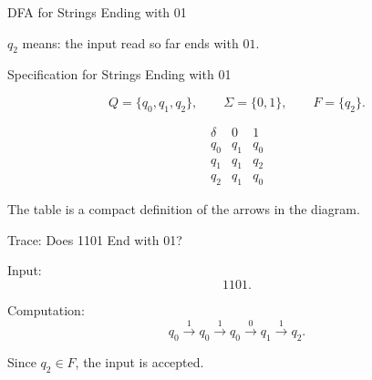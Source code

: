\documentclass[10pt,aspectratio=169]{beamer}
\begin{document}
\begin{frame}{DFA for Strings Ending with 01}

\begin{center}
\end{center}

\vspace{0.5em}

$q_2$ means: the input read so far ends with $01$.

\end{frame}

\begin{frame}{Specification for Strings Ending with 01}

\[
Q=\{q_0,q_1,q_2\},
\qquad
\Sigma=\{0,1\},
\qquad
F=\{q_2\}.
\]

\[
\begin{array}{c|cc}
\delta & 0 & 1\\
\hline
q_0 & q_1 & q_0\\
q_1 & q_1 & q_2\\
q_2 & q_1 & q_0
\end{array}
\]

\pause

The table is a compact definition of the arrows in the diagram.

\end{frame}

\begin{frame}{Trace: Does 1101 End with 01?}

Input:
\[
1101.
\]

\pause

Computation:
\[
q_0
\xrightarrow{1}
q_0
\xrightarrow{1}
q_0
\xrightarrow{0}
q_1
\xrightarrow{1}
q_2.
\]

\pause

Since $q_2\in F$, the input is accepted.

\end{frame}
\end{document}
